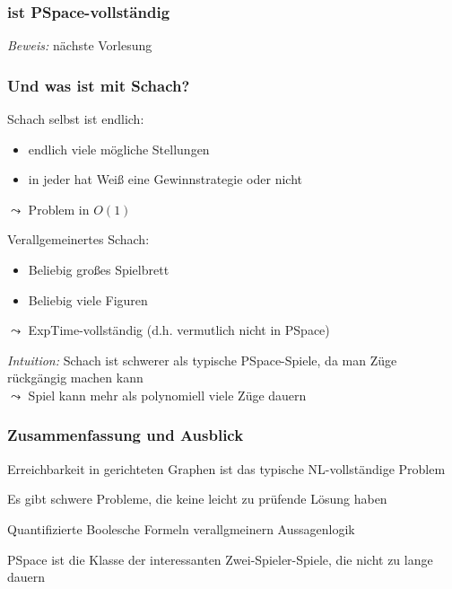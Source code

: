 \documentclass[aspectratio=1610,onlymath]{beamer}
\begin{document}
\begin{frame}\frametitle{ ist PSpace-vollständig}

\pause

\emph{Beweis:} nächste Vorlesung

\end{frame}

\begin{frame}\frametitle{Und was ist mit Schach?}
\pause

Schach selbst ist endlich:
\begin{itemize}
\item endlich viele mögliche Stellungen
\item in jeder hat Weiß eine Gewinnstrategie oder nicht
\end{itemize}
$\leadsto$ Problem in $O(1)$
\bigskip\pause

\alert{Verallgemeinertes Schach:}
\begin{itemize}
\item Beliebig großes Spielbrett
\item Beliebig viele Figuren
\end{itemize}
$\leadsto$ ExpTime-vollständig (d.h. vermutlich nicht in PSpace)
\bigskip\pause

\emph{Intuition:} Schach ist schwerer als typische PSpace-Spiele, da man 
Züge rückgängig machen kann\\
$\leadsto$ Spiel kann mehr als polynomiell viele Züge dauern
\end{frame}



\begin{frame}\frametitle{Zusammenfassung und Ausblick}

Erreichbarkeit in gerichteten Graphen ist das typische NL-vollständige Problem
\bigskip

Es gibt schwere Probleme, die keine leicht zu prüfende Lösung haben\bigskip

Quantifizierte Boolesche Formeln verallgmeinern Aussagenlogik\bigskip

PSpace ist die Klasse der interessanten Zwei-Spieler-Spiele, die nicht zu lange dauern
\bigskip


\end{frame}
\end{document}
